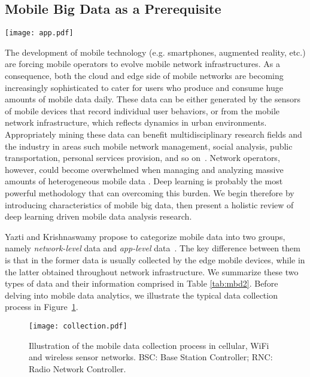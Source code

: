 \documentclass[journal,comsoc,letter]{IEEEtran}
\newcommand{\rev}[1]{\textcolor{black}{#1}}
\begin{document}
\subsection{Mobile Big Data as a Prerequisite}
\begin{figure*}[htb]
\begin{center}
\texttt{[image: app.pdf]}
\caption{\label{fig:app} \rev{Typical pipeline of an app-level mobile data processing system.} }
\end{center}
\end{figure*}
The development of mobile technology (e.g. smartphones, augmented reality, etc.) are forcing mobile operators to evolve mobile network infrastructures. As a consequence, both the cloud and edge side of mobile networks are becoming increasingly sophisticated to cater for users who produce and consume huge amounts of mobile data daily. These data can be either generated by the sensors of mobile devices that record individual user behaviors, or from the mobile network infrastructure, which reflects dynamics in urban environments. Appropriately mining these data can benefit multidisciplinary research fields and the industry in areas such mobile network management, social analysis, public transportation, personal services provision, and so on~\cite{cheng2017exploiting}.
Network operators, however, could become overwhelmed when managing and analyzing massive amounts of heterogeneous mobile data \cite{ahmed2018recent}. Deep learning is probably the most powerful methodology that can overcoming this burden. We begin therefore by introducing characteristics of mobile big data, then present a holistic review of deep learning driven mobile data analysis research.

Yazti and Krishnaswamy propose to categorize mobile data into two groups, namely \emph{network-level} data and \emph{app-level} data~\cite{yazti2014mobile}. The key difference between them is that in the former data is usually collected by the edge mobile devices, while in the latter obtained throughout network infrastructure. We summarize these two types of data and their information comprised in Table \ref{tab:mbd2}. Before delving into mobile data analytics, we illustrate the typical data collection process in Figure~\ref{fig:collection}.

\begin{figure}[t]
\begin{center}
\texttt{[image: collection.pdf]}
\caption{\label{fig:collection} Illustration of the mobile data collection process in cellular, WiFi and wireless sensor networks. BSC: Base Station Controller; RNC: Radio Network Controller.}
\end{center}
\end{figure}
\end{document}
